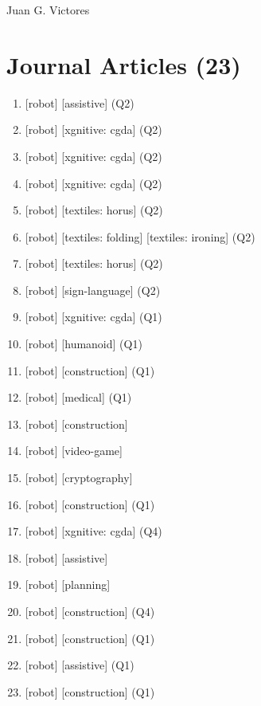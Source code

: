 \documentclass{article}
\def\name{Juan G. Victores}
\begin{document}
{\huge \name}

\vspace{0.2in}



\section*{Journal Articles (23)}
\begin{enumerate}
  \item {} [robot] [assistive] (Q2)
  \item {} [robot] [xgnitive: cgda] (Q2)
  \item {} [robot] [xgnitive: cgda] (Q2)
  \item {} [robot] [xgnitive: cgda] (Q2)
  \item {} [robot] [textiles: horus] (Q2)
  \item {} [robot] [textiles: folding] [textiles: ironing] (Q2)
  \item {} [robot] [textiles: horus] (Q2)
  \item {} [robot] [sign-language] (Q2)
  \item {} [robot] [xgnitive: cgda] (Q1)
  \item {} [robot] [humanoid] (Q1)
  \item {} [robot] [construction] (Q1)
  \item {} [robot] [medical] (Q1)
  \item {} [robot] [construction]
  \item {} [robot] [video-game]
  \item {} [robot] [cryptography]
  \item {} [robot] [construction] (Q1)
  \item {} [robot] [xgnitive: cgda] (Q4)
  \item {} [robot] [assistive]
  \item {} [robot] [planning]
  \item {} [robot] [construction] (Q4)
  \item {} [robot] [construction] (Q1)
  \item {} [robot] [assistive] (Q1)
  \item {} [robot] [construction] (Q1)
\end{enumerate}
\end{document}
